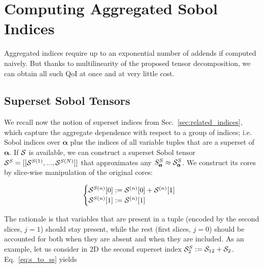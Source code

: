 \documentclass[review, twocolumn]{svjour3}          %
\begin{document}
\section{Computing Aggregated Sobol Indices} \label{sec:set_operations}

Aggregated indices require up to an exponential number of addends if computed naively. But thanks to multilinearity of the proposed tensor decomposition, we can obtain all such QoI at once and at very little cost.

\subsection{Superset Sobol Tensors} \label{sec:superset_sobol_tensor}

We recall now the notion of superset indices from Sec.~\ref{sec:related_indices}, which capture the aggregate dependence with respect to a group of indices; i.e. Sobol indices over $\pmb{\alpha}$ plus the indices of all variable tuples that are a superset of $\pmb{\alpha}$.
%
%
If $\mathcal{S}$ is available, we can construct a superset Sobol tensor $\mathcal{S}^S = [[\mathcal{S}^{S (1)}, ..., \mathcal{S}^{S (N)}]]$ that approximates any $S^S_{\pmb{\alpha}} \approx \mathcal{S}^S_{\pmb{\alpha}}$. We construct its cores by slice-wise manipulation of the original cores:

\begin{equation}
\label{eq:s_to_ss}
\begin{cases}
\mathcal{S}^{S (n)}[0] := \mathcal{S}^{(n)}[0] + \mathcal{S}^{(n)}[1] \\
\mathcal{S}^{S (n)}[1] := \mathcal{S}^{(n)}[1]
\end{cases}
\end{equation}

The rationale is that variables that are present in a tuple (encoded by the second slices, $j=1$) should stay present, while the rest (first slices, $j=0$) should be accounted for both when they are absent and when they are included. As an example, let us consider in 2D the second superset index $\mathcal{S}^S_2 := \mathcal{S}_{12} + \mathcal{S}_2$. Eq.~\ref{eq:s_to_ss} yields
\end{document}
